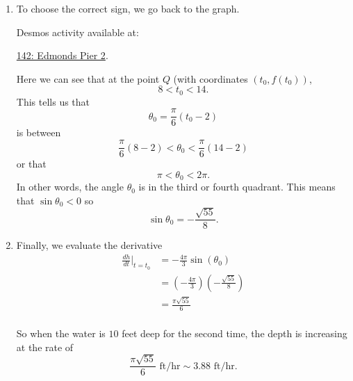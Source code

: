 \documentclass{ximera}
\begin{document}
\begin{example}
\begin{enumerate}
\item To choose the correct sign, we go back to the graph.

Desmos activity available at:

\href{https://www.desmos.com/calculator/fs9xy1lf0e}{142: Edmonds Pier 2}.

 
\begin{onlineOnly}
    \begin{center}
\end{center}
\end{onlineOnly}

Here we can see that at the point $Q$ (with coordinates $(t_0, f(t_0))$, 
\[
          8 < t_0 < 14.
\]  
This tells us that 
\[
 \theta_ 0 =  \frac{\pi}{6} \left( t_0 - 2 \right)
\]
is between
\[
       \frac{\pi}{6} \left(8 - 2 \right)  <   \theta_0  < \frac{\pi}{6} \left(14 - 2 \right)
\]
or that
\[
     \pi < \theta_0 < 2\pi .
\]  
In other words, the angle $\theta_0$ is in the third or fourth quadrant. This means that $\sin\theta_0 < 0$ so 
\[
 \sin\theta_0 = - \frac{\sqrt{55}}{8} .
\]

\item Finally, we evaluate the derivative
\begin{align*}
 \frac{dh}{dt}\Big|_{t=t_0} &=-\frac{4\pi}{3} \sin\left( \theta_0   \right)  \\
                                         & = \left(- \frac{4\pi}{3}\right)  \left( - \frac{\sqrt{55}}{8} \right) \\
                                        &= \frac{\pi \sqrt{55}}{6} \\
\end{align*}

So when the water is $10$ feet deep for the second time, the depth is increasing at the rate of 
\[
  \frac{\pi \sqrt{55}}{6} \text{ ft/hr} \sim 3.88\text{ ft/hr} .
\]

\end{enumerate}
\end{example}
\end{document}
